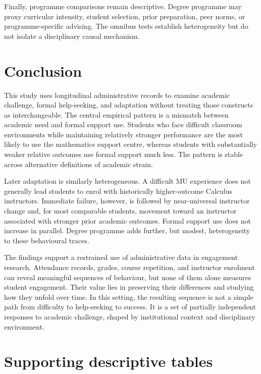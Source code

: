 Finally, programme comparisons remain descriptive. Degree programme may proxy curricular intensity, student selection, prior preparation, peer norms, or programme-specific advising. The omnibus tests establish heterogeneity but do not isolate a disciplinary causal mechanism.


\section{Conclusion}

This study uses longitudinal administrative records to examine academic challenge, formal help-seeking, and adaptation without treating those constructs as interchangeable. The central empirical pattern is a mismatch between academic need and formal support use. Students who face difficult classroom environments while maintaining relatively stronger performance are the most likely to use the mathematics support centre, whereas students with substantially weaker relative outcomes use formal support much less. The pattern is stable across alternative definitions of academic strain.

Later adaptation is similarly heterogeneous. A difficult MU experience does not generally lead students to enrol with historically higher-outcome Calculus instructors. Immediate failure, however, is followed by near-universal instructor change and, for most comparable students, movement toward an instructor associated with stronger prior academic outcomes. Formal support use does not increase in parallel. Degree programme adds further, but modest, heterogeneity to these behavioural traces.

The findings support a restrained use of administrative data in engagement research. Attendance records, grades, course repetition, and instructor enrolment can reveal meaningful sequences of behaviour, but none of them alone measures student engagement. Their value lies in preserving their differences and studying how they unfold over time. In this setting, the resulting sequence is not a simple path from difficulty to help-seeking to success. It is a set of partially independent responses to academic challenge, shaped by institutional context and disciplinary environment.


\printbibliography

\clearpage
\appendix
\section{Supporting descriptive tables}
\label{app:supporting-tables}
\setcounter{table}{0}
\renewcommand{\thetable}{A\arabic{table}}

